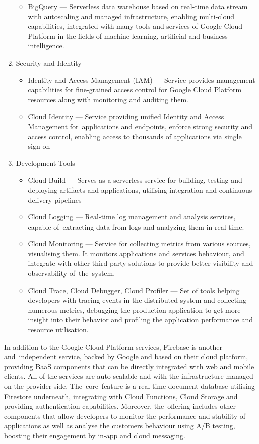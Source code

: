 \begin{enumerate}
\begin{itemize}
       \item BigQuery --- Serverless data warehouse based on real-time data stream with autoscaling and managed infrastructure, enabling multi-cloud capabilities, integrated with many tools and services of Google Cloud Platform in the fields of machine learning, artificial and business intelligence.
   \end{itemize}
   \item Security and Identity
   \begin{itemize}
       \item Identity and Access Management (IAM) --- Service provides management capabilities for fine-grained access control for Google Cloud Platform resources along with monitoring and auditing them.
       \item Cloud Identity --- Service providing unified Identity and Access Management for~applications and endpoints, enforce strong security and access control, enabling access to thousands of applications via single sign-on
   \end{itemize}
   \item Development Tools
   \begin{itemize}
       \item Cloud Build --- Serves as a serverless service for building, testing and deploying artifacts and applications, utilising integration and continuous delivery pipelines
       \item Cloud Logging --- Real-time log management and analysis services, capable of~extracting data from logs and analyzing them in real-time.
       \item Cloud Monitoring --- Service for collecting metrics from various sources, visualising them. It monitors applications and services behaviour, and integrate with other third party solutions to provide better visibility and observability of~the~system.
       \item Cloud Trace, Cloud Debugger, Cloud Profiler --- Set of tools helping developers with tracing events in the distributed system and collecting numerous metrics, debugging the production application to get more insight into their behavior and profiling the application performance and resource utilisation.
   \end{itemize}
\end{enumerate}

In addition to the Google Cloud Platform services, Firebase \cite{Firebase} is another and~independent service, backed by Google and based on their cloud platform, providing BaaS components that can be directly integrated with web and mobile clients. All of the services are auto-scalable and with the infrastructure managed on the provider side. The~core~feature is a real-time document database utilising Firestore underneath, integrating with Cloud Functions, Cloud Storage and providing authentication capabilities. Moreover, the~offering includes other components that allow developers to monitor the performance and stability of applications as well as analyse the customers behaviour using A/B testing, boosting their engagement by in-app and cloud messaging.

